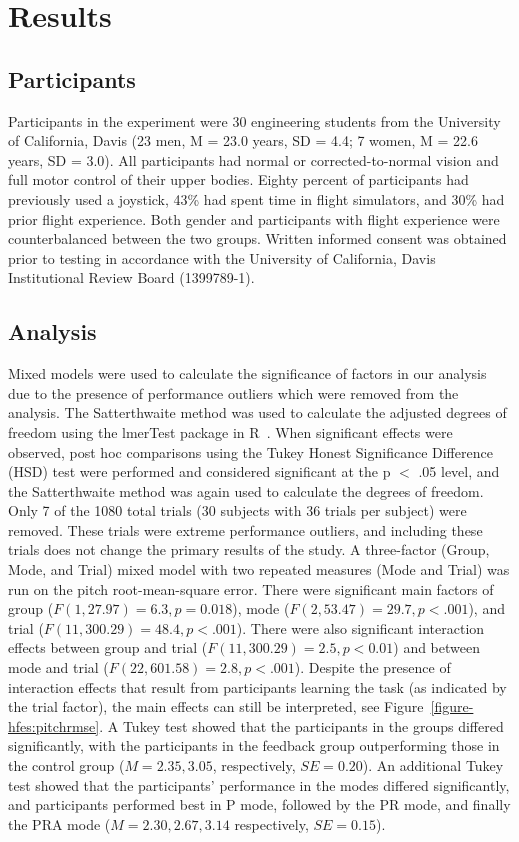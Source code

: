 \section{Results}
\subsection{Participants}
Participants in the experiment were 30 engineering students from the University of California, Davis (23 men, M = 23.0 years, SD = 4.4; 7 women, M = 22.6 years, SD = 3.0).
All participants had normal or corrected-to-normal vision and full motor control of their upper bodies.
Eighty percent of participants had previously used a joystick, 43\% had spent time in flight simulators, and 30\% had prior flight experience.
Both gender and participants with flight experience were counterbalanced between the two groups.
Written informed consent was obtained prior to testing in accordance with the University of California, Davis Institutional Review Board (1399789-1).

\subsection{Analysis}
Mixed models were used to calculate the significance of factors in our analysis due to the presence of performance outliers which were removed from the analysis.
The Satterthwaite method was used to calculate the adjusted degrees of freedom using the lmerTest package in R~\citep{RN53}.
When significant effects were observed, post hoc comparisons using the Tukey Honest Significance Difference (HSD) test were performed and considered significant at the p $<$ .05 level, and the Satterthwaite method was again used to calculate the degrees of freedom.
Only 7 of the 1080 total trials (30 subjects with 36 trials per subject) were removed.
These trials were extreme performance outliers, and including these trials does not change the primary results of the study.
A three-factor (Group, Mode, and Trial) mixed model with two repeated measures (Mode and Trial) was run on the pitch root-mean-square error.
There were significant main factors of group ($F(1, 27.97) = 6.3, p = 0.018$), mode ($F(2, 53.47) = 29.7, p < .001$), and trial ($F(11, 300.29) = 48.4, p < .001$).
There were also significant interaction effects between group and trial ($F(11, 300.29) = 2.5, p < 0.01$) and between mode and trial ($F(22, 601.58) = 2.8, p < .001$).
Despite the presence of interaction effects that result from participants learning the task (as indicated by the trial factor), the main effects can still be interpreted, see Figure~\ref{figure-hfes:pitchrmse}.
A Tukey test showed that the participants in the groups differed significantly, with the participants in the feedback group outperforming those in the control group ($M = 2.35, 3.05$, respectively, $SE = 0.20$).
An additional Tukey test showed that the participants' performance in the modes differed significantly, and participants performed best in P mode, followed by the PR mode, and finally the PRA mode ($M = 2.30, 2.67, 3.14$ respectively, $SE = 0.15$).

